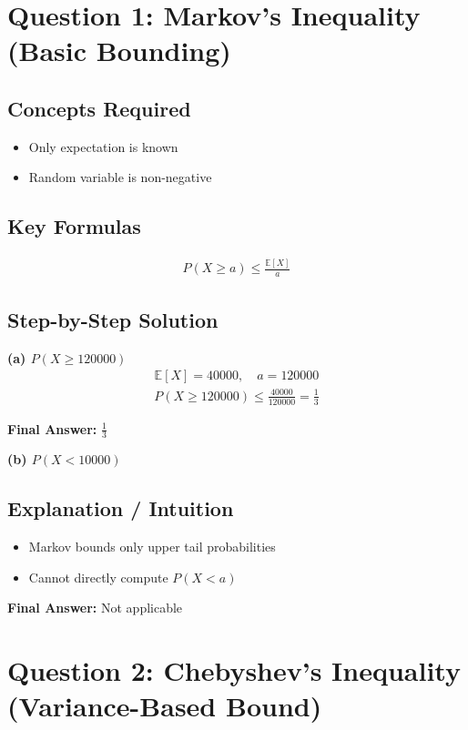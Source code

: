 \documentclass{article}
\begin{document}
\section{Question 1: Markov’s Inequality (Basic Bounding)}

\subsection{Concepts Required}
\begin{itemize}
\item Only expectation is known
\item Random variable is non-negative
\end{itemize}

\subsection{Key Formulas}
\begin{align}
P(X \ge a) \le \frac{\mathbb{E}[X]}{a}
\end{align}

\subsection{Step-by-Step Solution}

\textbf{(a) $P(X \ge 120000)$}
\begin{align}
\mathbb{E}[X] = 40000,\quad a = 120000
\end{align}
\begin{align}
P(X \ge 120000) \le \frac{40000}{120000} = \frac{1}{3}
\end{align}

\textbf{Final Answer:} $\frac{1}{3}$

\textbf{(b) $P(X < 10000)$}

\subsection{Explanation / Intuition}
\begin{itemize}
\item Markov bounds only upper tail probabilities
\item Cannot directly compute $P(X < a)$
\end{itemize}

\textbf{Final Answer:} Not applicable

\section{Question 2: Chebyshev’s Inequality (Variance-Based Bound)}
\end{document}
